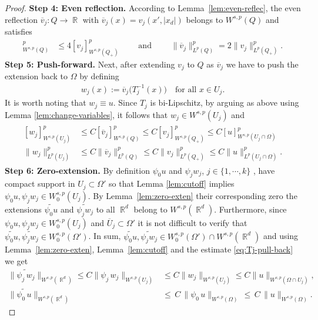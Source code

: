 \documentclass[12pt, reqno]{amsart}%
\theoremstyle{plain}  %
\theoremstyle{definition}  %
\theoremstyle{remark}
\numberwithin{equation}{section}
\DeclareMathOperator{\R}{\mathbb{R}}
\begin{document}
\begin{proof}
\smallskip
\textbf{Step 4: Even reflection.} According to  Lemma~\ref{lem:even-reflec}, the even reflection $\overline{v}_j:Q\to \R$ with  $\overline{v}_j(x)=v_j(x',|x_d|)$  belongs to $W^{s,p}(Q)$ and satisfies
\begin{align*}
[\overline{v}_j]^p_{W^{s,p}(Q)}
&\leq 4 [v_j]^p_{W^{s,p}(Q_+)}\qquad \text{ and }\qquad
\|\overline{v}_j\|^p_{L^p(Q) }
= 2 \|v_j\|^p_{L^p(Q_+)}.
\end{align*}
\textbf{Step 5: Push-forward.} Next, after extending $v_j$ to $Q$ as $\overline{v}_j$ we  have to push the extension back to $\Omega$ by defining
\begin{align*}
w_j(x):=\overline{v}_j\big(T_j^{-1}(x)\big)
\quad \text{for all } x\in U_j .
\end{align*}
It is worth noting that  $w_j\equiv u$. Since $T_j$ is bi-Lipschitz, by arguing  as above using  Lemma \ref{lem:change-variables},  it follows that $w_j\in W^{s,p}(U_j)$ and
\begin{align} \label{eq:Tj-pull-back}
\begin{split}
[w_j]^p_{W^{s,p}(U_j)}
&\leq C [\overline{v}_j]^p_{W^{s,p}(Q)}\leq C [v_j]^p_{W^{s,p}(Q_+)}\leq C [u]^p_{W^{s,p}(U_j\cap \Omega)}\\
\|w_j\|^p_{L^p(U_j) }
&\leq C \|\overline{v}_j\|^p_{L^p(Q)} \leq C\|v_j\|^p_{L^p(Q_+) }
\leq C \|u\|^p_{L^p(U_j\cap\Omega)}.
\end{split}
\end{align}
\textbf{Step 6: Zero-extension.} By definition $\psi_0u$ and $\psi_jw_j$,  $j\in\{1,\cdots,k\}$ , have compact support in $U_j\subset \Omega'$ so that Lemma \ref{lem:cutoff} implies $\psi_0u,\psi_jw_j\in W^{s,p}_0(U_j)$. By Lemma~\ref{lem:zero-exten} their corresponding zero the extensions $\widetilde{\psi_0 u}$ and $\widetilde{\psi_jw_j}$ to all $\R^d$ belong to $W^{s,p}(\R^d)$. Furthermore, since $\psi_0u,\psi_jw_j\in W^{s,p}_0(U_j)$ and  $\overline{U}_j\subset \Omega'$ it is not difficult to verify that $\widetilde{\psi_0 u}, \widetilde{\psi_jw_j}\in W^{s,p}_0(\Omega')$.
In sum,  $\widetilde{\psi_0 u}, \widetilde{\psi_jw_j}\in W^{s,p}_0(\Omega')\cap W^{s,p}(\R^d)$ and using Lemma~\ref{lem:zero-exten}, Lemma~\ref{lem:cutoff} and the estimate \eqref{eq:Tj-pull-back} we get
\begin{align}\label{eq:jth-cutoff}
\|\widetilde{\psi_j\,w_j}\|_{W^{s,p}(\R^d)}
\leq  C \|\psi_j\,w_j\|_{W^{s,p}(U_j)}  &\leq C \|w_j\|_{W^{s,p}(U_j)}\leq C \|u\|_{W^{s,p}(\Omega\cap U_j)},
\\
\label{eq:first-cutoff}
\|\widetilde{\psi_0\,u}\|_{W^{s,p}(\R^d)}&\leq \,C\,\| \psi_0\,u\|_{W^{s,p}(\Omega)}\,\leq\, C\, \|u\|_{W^{s,p}(\Omega)}.

\end{align}
\end{proof}
\end{document}
